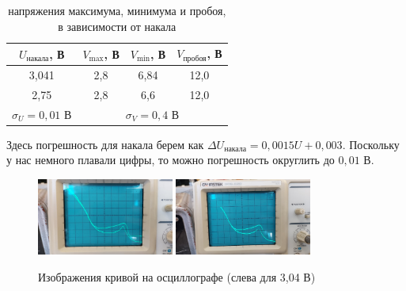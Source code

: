 \documentclass[a4paper, 12pt]{article}%
\begin{document}
\begin{table}[h]
\begin{center}
\begin{tabular}{|c|c|c|c|}
\hline
{\color[HTML]{333333} $U_{\text{накала}}$, В} & {\color[HTML]{333333} $V_{\max}$, В} & {\color[HTML]{333333} $V_{\min}$, В} & {\color[HTML]{333333} $V_{\text{пробоя}}$, В} \\ \hline
{\color[HTML]{333333} 3,041}                & {\color[HTML]{333333} 2,8}        & {\color[HTML]{333333} 6,84}        & {\color[HTML]{333333} 12,0}                  \\ \hline
{\color[HTML]{333333} 2,75}                & {\color[HTML]{333333} 2,8}        & {\color[HTML]{333333} 6,6}          & {\color[HTML]{333333} 12,0}                  \\ \hline
{\color[HTML]{333333} $\sigma_U = 0,01$ В} & \multicolumn{3}{c|}{{\color[HTML]{333333} $\sigma_V = 0,4$ В}}                                                     \\ \hline
\end{tabular}
\caption{напряжения максимума, минимума и пробоя, в зависимости от накала}
\end{center}
\end{table}
Здесь погрешность для накала берем как $\Delta U_{\text{накала}} = 0,0015 U + 0,003$. Поскольку у нас немного плавали цифры, то можно погрешность округлить до $0,01$ В.
\begin{figure}[h]
\begin{center}
\includegraphics[width = 0.4\textwidth]{2.jpg}
\includegraphics[width = 0.4\textwidth]{4.jpg}
\caption{Изображения кривой на осциллографе (слева для 3,04 В)}
\end{center}
\end{figure}
\end{document}
